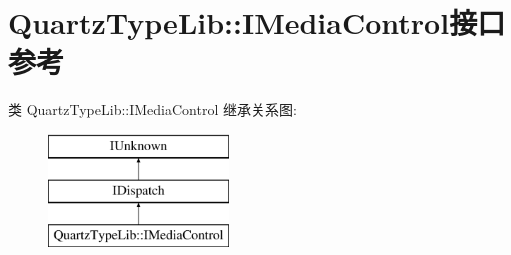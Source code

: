 \hypertarget{interface_quartz_type_lib_1_1_i_media_control}{}\section{Quartz\+Type\+Lib\+:\+:I\+Media\+Control接口 参考}
\label{interface_quartz_type_lib_1_1_i_media_control}
类 Quartz\+Type\+Lib\+:\+:I\+Media\+Control 继承关系图\+:\begin{figure}[H]
\begin{center}
\leavevmode
\includegraphics[height=3.000000cm]{interface_quartz_type_lib_1_1_i_media_control}
\end{center}
\end{figure}
